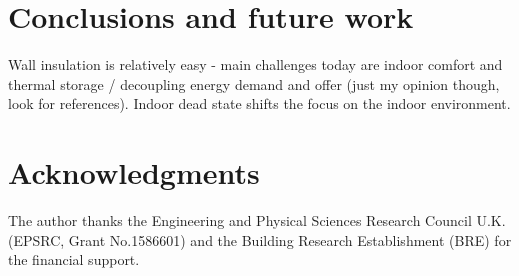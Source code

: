 \documentclass[10pt]{extarticle} %
\begin{document}
\vfill \break

\section{Conclusions and future work}
Wall insulation is relatively easy - main challenges today are indoor comfort and thermal storage / decoupling energy demand and offer (just my opinion though, look for references). Indoor dead state shifts the focus on the indoor environment.

\section*{Acknowledgments}

The author thanks the Engineering and Physical Sciences Research Council U.K. (EPSRC, Grant No.1586601) and the Building Research Establishment (BRE) for the financial support.

{\small %
 
}

\vfill \break
\end{document}
